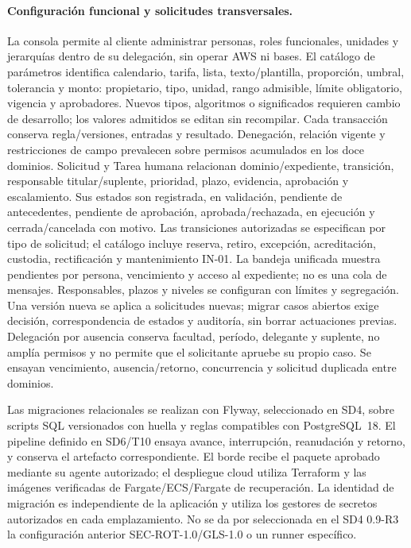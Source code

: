 \paragraph{Configuración funcional y solicitudes transversales.}
La consola permite al cliente administrar personas, roles funcionales, unidades y jerarquías dentro de su delegación, sin operar AWS ni bases. El catálogo de parámetros identifica calendario, tarifa, lista, texto/plantilla, proporción, umbral, tolerancia y monto: propietario, tipo, unidad, rango admisible, límite obligatorio, vigencia y aprobadores. Nuevos tipos, algoritmos o significados requieren cambio de desarrollo; los valores admitidos se editan sin recompilar. Cada transacción conserva regla/versiones, entradas y resultado. Denegación, relación vigente y restricciones de campo prevalecen sobre permisos acumulados en los doce dominios.
Solicitud y Tarea humana relacionan dominio/expediente, transición, responsable titular/suplente, prioridad, plazo, evidencia, aprobación y escalamiento. Sus estados son registrada, en validación, pendiente de antecedentes, pendiente de aprobación, aprobada/rechazada, en ejecución y cerrada/cancelada con motivo. Las transiciones autorizadas se especifican por tipo de solicitud; el catálogo incluye reserva, retiro, excepción, acreditación, custodia, rectificación y mantenimiento IN-01. La bandeja unificada muestra pendientes por persona, vencimiento y acceso al expediente; no es una cola de mensajes.
Responsables, plazos y niveles se configuran con límites y segregación. Una versión nueva se aplica a solicitudes nuevas; migrar casos abiertos exige decisión, correspondencia de estados y auditoría, sin borrar actuaciones previas. Delegación por ausencia conserva facultad, período, delegante y suplente, no amplía permisos y no permite que el solicitante apruebe su propio caso. Se ensayan vencimiento, ausencia/retorno, concurrencia y solicitud duplicada entre dominios.

Las migraciones relacionales se realizan con Flyway, seleccionado en SD4, sobre scripts SQL versionados con huella y reglas compatibles con PostgreSQL~18. El pipeline definido en SD6/T10 ensaya avance, interrupción, reanudación y retorno, y conserva el artefacto correspondiente. El borde recibe el paquete aprobado mediante su agente autorizado; el despliegue cloud utiliza Terraform y las imágenes verificadas de Fargate/ECS/Fargate de recuperación. La identidad de migración es independiente de la aplicación y utiliza los gestores de secretos autorizados en cada emplazamiento. No se da por seleccionada en el SD4 0.9-R3 la configuración anterior SEC-ROT-1.0/GLS-1.0 o un runner específico.

